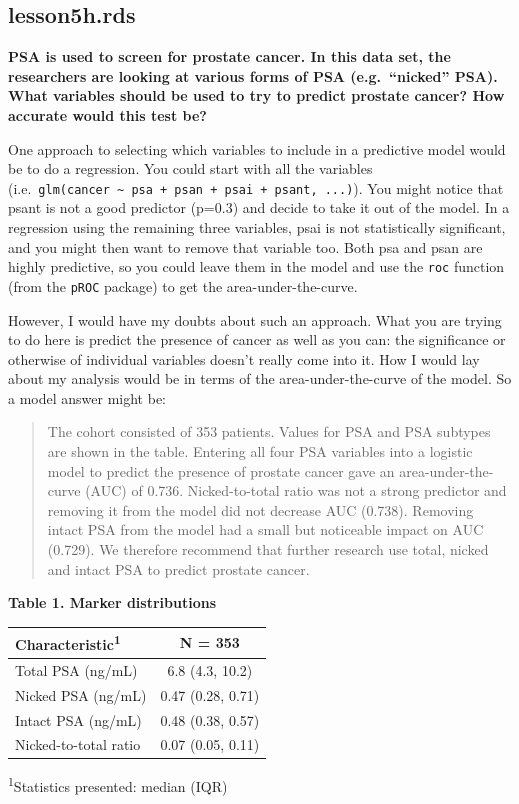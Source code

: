 \documentclass[]{book}
\begin{document}
\hypertarget{lesson5h.rds}{%
\subsection{lesson5h.rds}\label{lesson5h.rds}}

\textbf{PSA is used to screen for prostate cancer. In this data set, the
researchers are looking at various forms of PSA (e.g.~``nicked'' PSA).
What variables should be used to try to predict prostate cancer? How
accurate would this test be?}

One approach to selecting which variables to include in a predictive
model would be to do a regression. You could start with all the
variables
(i.e.~\texttt{glm(cancer\ \textasciitilde{}\ psa\ +\ psan\ +\ psai\ +\ psant,\ ...)}).
You might notice that psant is not a good predictor (p=0.3) and decide
to take it out of the model. In a regression using the remaining three
variables, psai is not statistically significant, and you might then
want to remove that variable too. Both psa and psan are highly
predictive, so you could leave them in the model and use the
\texttt{roc} function (from the \texttt{pROC} package) to get the
area-under-the-curve.

However, I would have my doubts about such an approach. What you are
trying to do here is predict the presence of cancer as well as you can:
the significance or otherwise of individual variables doesn't really
come into it. How I would lay about my analysis would be in terms of the
area-under-the-curve of the model. So a model answer might be:

\begin{quote}
The cohort consisted of 353 patients. Values for PSA and PSA subtypes
are shown in the table. Entering all four PSA variables into a logistic
model to predict the presence of prostate cancer gave an
area-under-the-curve (AUC) of 0.736. Nicked-to-total ratio was not a
strong predictor and removing it from the model did not decrease AUC
(0.738). Removing intact PSA from the model had a small but noticeable
impact on AUC (0.729). We therefore recommend that further research use
total, nicked and intact PSA to predict prostate cancer.
\end{quote}

\textbf{Table 1. Marker distributions}

\captionsetup[table]{labelformat=empty,skip=1pt}
\begin{longtable}{lc}
\toprule
\textbf{Characteristic}\textsuperscript{1} & \textbf{N = 353} \\ 
\midrule
Total PSA (ng/mL) & 6.8 (4.3, 10.2) \\ 
Nicked PSA (ng/mL) & 0.47 (0.28, 0.71) \\ 
Intact PSA (ng/mL) & 0.48 (0.38, 0.57) \\ 
Nicked-to-total ratio & 0.07 (0.05, 0.11) \\ 
\bottomrule
\end{longtable}
\vspace{-5mm}
\begin{minipage}{\linewidth}
\textsuperscript{1}Statistics presented: median (IQR) \\ 
\end{minipage}
\end{document}
